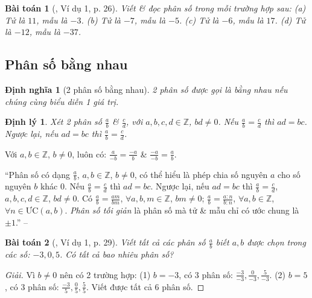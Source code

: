 \documentclass{article}
\newtheorem{baitoan}{Bài toán}
\newtheorem{dinhly}{Định lý}
\newtheorem{dinhnghia}{Định nghĩa}
\begin{document}
\begin{baitoan}[\cite{SGK_Toan_6_Canh_Dieu_tap_2}, Ví dụ 1, p. 26]
	Viết \& đọc phân số trong mỗi trường hợp sau: (a) Tử là $11$, mẫu là $-3$. (b) Tử là $-7$, mẫu là $-5$. (c) Tử là $-6$, mẫu là $17$. (d) Tử là $-12$, mẫu là $-37$.
\end{baitoan}



\subsection{Phân số bằng nhau}

\begin{dinhnghia}[2 phân số bằng nhau]
	2 phân số được gọi là \emph{bằng nhau} nếu chúng cùng biểu diễn 1 giá trị.
\end{dinhnghia}

\begin{dinhly}
	Xét 2 phân số $\frac{a}{b}$ \& $\frac{c}{d}$, với $a,b,c,d\in\mathbb{Z}$, $bd\ne0$. Nếu $\frac{a}{b} = \frac{c}{d}$ thì $ad = bc$. Ngược lại, nếu $ad = bc$ thì $\frac{a}{b} = \frac{c}{d}$.
\end{dinhly}
Với $a,b\in\mathbb{Z}$, $b\ne0$, luôn có: $\frac{a}{-b} = \frac{-a}{b}$ \& $\frac{-a}{-b} = \frac{a}{b}$.

``Phân số có dạng $\frac{a}{b}$, $a,b\in\mathbb{Z}$, $b\ne0$, có thể hiểu là phép chia số nguyên $a$ cho số nguyên $b$ khác $0$. Nếu $\frac{a}{b} = \frac{c}{d}$ thì $ad = bc$. Ngược lại, nếu $ad = bc$ thì $\frac{a}{b} = \frac{c}{d}$, $a,b,c,d\in\mathbb{Z}$, $bd\ne0$. Có $\frac{a}{b} = \frac{am}{bm}$, $\forall a,b,m\in\mathbb{Z}$, $bm\ne0$; $\frac{a}{b} = \frac{a:n}{b:n}$, $\forall a,b\in\mathbb{Z}$, $\forall n\in\mbox{ƯC}(a,b)$. \textit{Phân số tối giản} là phân số mà tử \& mẫu chỉ có ước chung là $\pm1$.'' -- \cite[Chap. V, \S1, p. 29]{SBT_Toan_6_Canh_Dieu_tap_2}

\begin{baitoan}[\cite{SBT_Toan_6_Canh_Dieu_tap_2}, Ví dụ 1, p. 29]
	Viết tất cả các phân số $\frac{a}{b}$ biết $a,b$ được chọn trong các số: $-3,0,5$. Có tất cả bao nhiêu phân số?
\end{baitoan}

\begin{proof}[Giải]
	Vì $b\ne0$ nên có 2 trường hợp: (1) $b = -3$, có 3 phân số: $\frac{-3}{-3},\frac{0}{-3},\frac{5}{-3}$. (2) $b = 5$, có $3$ phân số: $\frac{-3}{5},\frac{0}{5},\frac{5}{5}$. Viết được tất cả $6$ phân số.
\end{proof}
\end{document}
